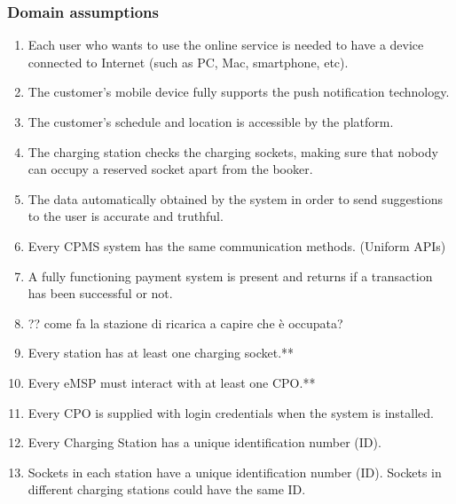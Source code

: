 \subsubsection{Domain assumptions}
\begin{enumerate}[label=\textbf{D\arabic*}:]
    \item Each user who wants to use the online service is needed to have a device connected to Internet (such as PC, Mac, smartphone, etc).
    \item The customer's mobile device fully supports the push notification technology.
    \item The customer's schedule and location is accessible by the platform.
    \item The charging station checks the charging sockets, making sure that nobody can occupy a reserved socket apart from the booker.
    \item The data automatically obtained by the system in order to send suggestions to the user is accurate and truthful.
    \item Every CPMS system has the same communication methods. (Uniform APIs)
    \item A fully functioning payment system is present and returns if a transaction has been successful or not.
    \item ?? come fa la stazione di ricarica a capire che è occupata?
    \item Every station has at least one charging socket.**
    \item Every eMSP must interact with at least one CPO.**
    \item Every CPO is supplied with login credentials when the system is installed.
    \item Every Charging Station has a unique identification number (ID).
    \item Sockets in each station have a unique identification number (ID). Sockets in different charging stations could have the same ID.
\end{enumerate}
